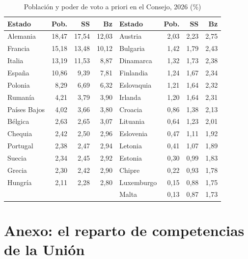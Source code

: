 \documentclass[11pt]{article}
\begin{document}
\begin{table}[H]
\centering
\caption{Población y poder de voto a priori en el Consejo, 2026 (\%)}\label{tab:poder}
\small
\begin{tabular}{lrrr@{\hspace{1.2cm}}lrrr}
\hline
\textbf{Estado} & \textbf{Pob.} & \textbf{SS} & \textbf{Bz} & \textbf{Estado} & \textbf{Pob.} & \textbf{SS} & \textbf{Bz}\\
\hline
Alemania & 18,47 & 17,54 & 12,03 & Austria & 2,03 & 2,23 & 2,75\\
Francia & 15,18 & 13,48 & 10,12 & Bulgaria & 1,42 & 1,79 & 2,43\\
Italia & 13,19 & 11,53 & 8,87 & Dinamarca & 1,32 & 1,73 & 2,38\\
España & 10,86 & 9,39 & 7,81 & Finlandia & 1,24 & 1,67 & 2,34\\
Polonia & 8,29 & 6,69 & 6,32 & Eslovaquia & 1,21 & 1,64 & 2,32\\
Rumanía & 4,21 & 3,79 & 3,90 & Irlanda & 1,20 & 1,64 & 2,31\\
Países Bajos & 4,02 & 3,66 & 3,80 & Croacia & 0,86 & 1,38 & 2,13\\
Bélgica & 2,63 & 2,65 & 3,07 & Lituania & 0,64 & 1,23 & 2,01\\
Chequia & 2,42 & 2,50 & 2,96 & Eslovenia & 0,47 & 1,11 & 1,92\\
Portugal & 2,38 & 2,47 & 2,94 & Letonia & 0,41 & 1,07 & 1,89\\
Suecia & 2,34 & 2,45 & 2,92 & Estonia & 0,30 & 0,99 & 1,83\\
Grecia & 2,30 & 2,42 & 2,90 & Chipre & 0,22 & 0,93 & 1,78\\
Hungría & 2,11 & 2,28 & 2,80 & Luxemburgo & 0,15 & 0,88 & 1,75\\
& & & & Malta & 0,13 & 0,87 & 1,73\\
\hline
\end{tabular}
\end{table}

\section{Anexo: el reparto de competencias\cortetitulo{} de la Unión}\label{anexo:competencias}
\end{document}
